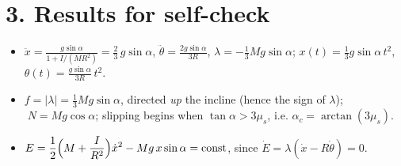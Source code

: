 \documentclass[11pt]{article}
\begin{document}
\section*{3. Results for self-check}

\begin{itemize}[leftmargin=*]
  \item[(c)] $\displaystyle \ddot x = \frac{g\sin\alpha}{1 + I/(MR^{2})}
             = \frac{2}{3}\,g\sin\alpha$, \quad
             $\displaystyle \ddot\theta = \frac{2g\sin\alpha}{3R}$, \quad
             $\displaystyle \lambda = -\frac{1}{3}Mg\sin\alpha$; \quad
             $x(t) = \tfrac{1}{3}g\sin\alpha\, t^{2}$,
             $\theta(t) = \tfrac{g\sin\alpha}{3R}\, t^{2}$.
  \item[(d)] $f = |\lambda| = \tfrac{1}{3}Mg\sin\alpha$, directed \emph{up} the
             incline (hence the sign of $\lambda$); $\;N = Mg\cos\alpha$;
             slipping begins when $\tan\alpha > 3\mu_s$, i.e.
             $\alpha_c = \arctan(3\mu_s)$.
  \item[(e)] $\displaystyle E = \frac{1}{2}\Bigl(M + \frac{I}{R^{2}}\Bigr)\dot x^{2}
             - Mg\,x\sin\alpha = \text{const}$, since
             $\dot E = \lambda(\dot x - R\dot\theta) = 0$.
\end{itemize}
\end{document}
